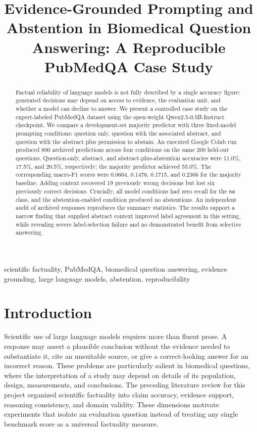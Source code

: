 \documentclass[conference]{IEEEtran}
\title{Evidence-Grounded Prompting and Abstention in Biomedical Question Answering: A Reproducible PubMedQA Case Study}
\author{\IEEEauthorblockN{Kartik Prakhar}\IEEEauthorblockA{MDE2026001\\Indian Institute of Information Technology, Allahabad}}
\begin{document}
\maketitle
\begin{abstract}
Factual reliability of language models is not fully described by a single accuracy figure: generated decisions may depend on access to evidence, the evaluation unit, and whether a model can decline to answer. We present a controlled case study on the expert-labeled PubMedQA dataset using the open-weight Qwen2.5-0.5B-Instruct checkpoint. We compare a development-set majority predictor with three fixed-model prompting conditions: question only, question with the associated abstract, and question with the abstract plus permission to abstain. An executed Google Colab run produced 800 archived predictions across four conditions on the same 200 held-out questions. Question-only, abstract, and abstract-plus-abstention accuracies were 11.0\%, 17.5\%, and 20.5\%, respectively; the majority predictor achieved 55.0\%. The corresponding macro-F1 scores were 0.0664, 0.1476, 0.1715, and 0.2366 for the majority baseline. Adding context recovered 19 previously wrong decisions but lost six previously correct decisions. Crucially, all model conditions had zero recall for the \texttt{no} class, and the abstention-enabled condition produced no abstentions. An independent audit of archived responses reproduces the summary statistics. The results support a narrow finding that supplied abstract context improved label agreement in this setting, while revealing severe label-selection failure and no demonstrated benefit from selective answering.
\end{abstract}
\begin{IEEEkeywords}
scientific factuality, PubMedQA, biomedical question answering, evidence grounding, large language models, abstention, reproducibility
\end{IEEEkeywords}

\section{Introduction}
Scientific use of large language models requires more than fluent prose. A response may assert a plausible conclusion without the evidence needed to substantiate it, cite an unsuitable source, or give a correct-looking answer for an incorrect reason. These problems are particularly salient in biomedical questions, where the interpretation of a study may depend on details of its population, design, measurements, and conclusions. The preceding literature review for this project organized scientific factuality into claim accuracy, evidence support, reasoning consistency, and domain validity. These dimensions motivate experiments that isolate an evaluation question instead of treating any single benchmark score as a universal factuality measure.
\end{document}
